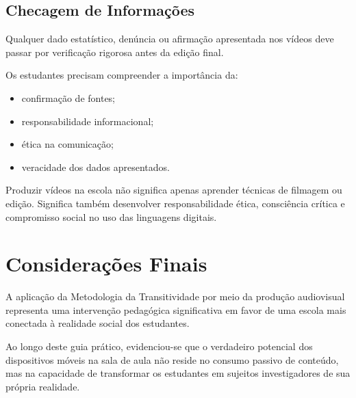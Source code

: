\documentclass[
  letterpaper,
  DIV=11,
  numbers=noendperiod]{scrreport}
\providecommand{\tightlist}{%
  \setlength{\itemsep}{0pt}\setlength{\parskip}{0pt}}
\begin{document}
\section{Checagem de Informações}\label{checagem-de-informauxe7uxf5es}

Qualquer dado estatístico, denúncia ou afirmação apresentada nos vídeos
deve passar por verificação rigorosa antes da edição final.

Os estudantes precisam compreender a importância da:

\begin{itemize}
\tightlist
\item
  confirmação de fontes;
\item
  responsabilidade informacional;
\item
  ética na comunicação;
\item
  veracidade dos dados apresentados.
\end{itemize}

\begin{tcolorbox}[enhanced jigsaw, arc=.35mm, bottomrule=.15mm, bottomtitle=1mm, breakable, colback=white, colbacktitle=quarto-callout-tip-color!10!white, colframe=quarto-callout-tip-color-frame, coltitle=black, left=2mm, leftrule=.75mm, opacityback=0, opacitybacktitle=0.6, rightrule=.15mm, title=\textcolor{quarto-callout-tip-color}{\faLightbulb}\hspace{0.5em}{Reflexão Pedagógica}, titlerule=0mm, toprule=.15mm, toptitle=1mm]

Produzir vídeos na escola não significa apenas aprender técnicas de
filmagem ou edição. Significa também desenvolver responsabilidade ética,
consciência crítica e compromisso social no uso das linguagens digitais.

\end{tcolorbox}


\chapter{Considerações Finais}\label{considerauxe7uxf5es-finais}

A aplicação da Metodologia da Transitividade por meio da produção
audiovisual representa uma intervenção pedagógica significativa em favor
de uma escola mais conectada à realidade social dos estudantes.

Ao longo deste guia prático, evidenciou-se que o verdadeiro potencial
dos dispositivos móveis na sala de aula não reside no consumo passivo de
conteúdo, mas na capacidade de transformar os estudantes em sujeitos
investigadores de sua própria realidade.
\end{document}
